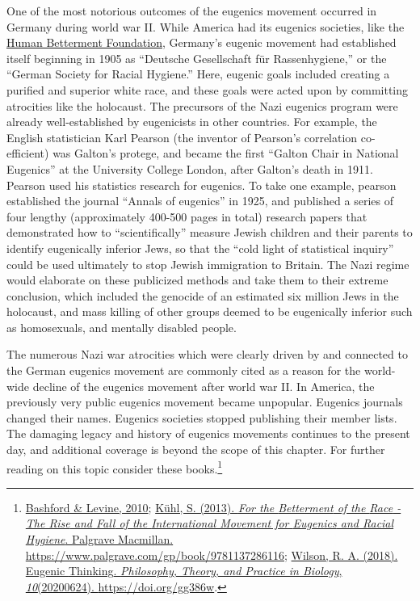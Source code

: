 \documentclass[
  oneside,
  12pt]{crumpbook}
\begin{document}
One of the most notorious outcomes of the eugenics movement occurred in Germany during world war II. While America had its eugenics societies, like the \href{https://en.wikipedia.org/wiki/Human_Betterment_Foundation}{Human Betterment Foundation}, Germany's eugenic movement had established itself beginning in 1905 as ``Deutsche Gesellschaft für Rassenhygiene,'' or the ``German Society for Racial Hygiene.'' Here, eugenic goals included creating a purified and superior white race, and these goals were acted upon by committing atrocities like the holocaust. The precursors of the Nazi eugenics program were already well-established by eugenicists in other countries. For example, the English statistician Karl Pearson (the inventor of Pearson's correlation co-efficient) was Galton's protege, and became the first ``Galton Chair in National Eugenics'' at the University College London, after Galton's death in 1911. Pearson used his statistics research for eugenics. To take one example, pearson established the journal ``Annals of eugenics'' in 1925, and published a series of four lengthy (approximately 400-500 pages in total) research papers that demonstrated how to ``scientifically'' measure Jewish children and their parents to identify eugenically inferior Jews, so that the ``cold light of statistical inquiry'' could be used ultimately to stop Jewish immigration to Britain. The Nazi regime would elaborate on these publicized methods and take them to their extreme conclusion, which included the genocide of an estimated six million Jews in the holocaust, and mass killing of other groups deemed to be eugenically inferior such as homosexuals, and mentally disabled people.

The numerous Nazi war atrocities which were clearly driven by and connected to the German eugenics movement are commonly cited as a reason for the world-wide decline of the eugenics movement after world war II. In America, the previously very public eugenics movement became unpopular. Eugenics journals changed their names. Eugenics societies stopped publishing their member lists. The damaging legacy and history of eugenics movements continues to the present day, and additional coverage is beyond the scope of this chapter. For further reading on this topic consider these books.\footnote{\protect\hyperlink{ref-bashfordOxfordHandbookHistory2010}{Bashford \& Levine, 2010}; \protect\hyperlink{ref-kuhlBettermentRaceRise2013}{Kühl, S. (2013). \emph{For the {Betterment} of the {Race} - {The Rise} and {Fall} of the {International Movement} for {Eugenics} and {Racial Hygiene}}. {Palgrave Macmillan}. \url{https://www.palgrave.com/gp/book/9781137286116}}; \protect\hyperlink{ref-wilsonEugenicThinking2018}{Wilson, R. A. (2018). Eugenic {Thinking}. \emph{Philosophy, Theory, and Practice in Biology}, \emph{10}(20200624). \url{https://doi.org/gg386w}}.}
\end{document}
